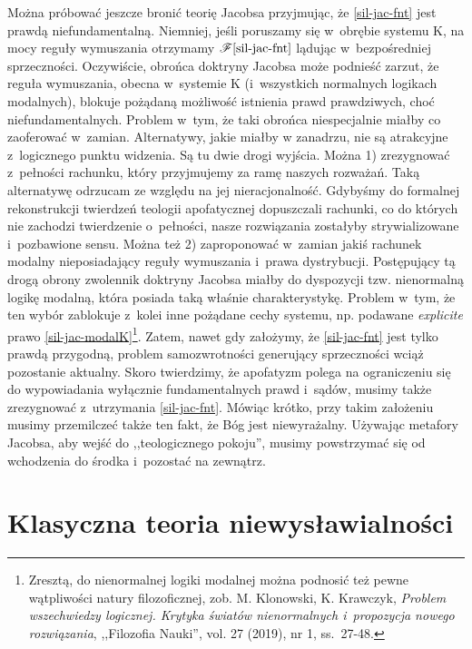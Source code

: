 Można próbować jeszcze bronić teorię Jacobsa przyjmując, że \ref{sil-jac-fnt} jest prawdą niefundamentalną. Niemniej, jeśli poruszamy się w~obrębie systemu K, na mocy reguły wymuszania otrzymamy $\mathscr{F} \eqref{sil-jac-fnt}$ lądując w~bezpośredniej sprzeczności. Oczywiście, obrońca doktryny Jacobsa może podnieść zarzut, że reguła wymuszania, obecna w~systemie K (i~wszystkich normalnych logikach modalnych), blokuje pożądaną możliwość istnienia prawd prawdziwych, choć niefundamentalnych. Problem w~tym, że taki obrońca niespecjalnie miałby co zaoferować w~zamian. Alternatywy, jakie miałby w zanadrzu, nie są atrakcyjne z~logicznego punktu widzenia. Są tu dwie drogi wyjścia. Można 1) zrezygnować z~pełności rachunku, który przyjmujemy za ramę naszych rozważań. Taką alternatywę odrzucam ze względu na jej nieracjonalność. Gdybyśmy do formalnej rekonstrukcji twierdzeń teologii apofatycznej dopuszczali rachunki, co do których nie zachodzi twierdzenie o~pełności, nasze rozwiązania zostałyby strywializowane i~pozbawione sensu. Można też 2) zaproponować w~zamian jakiś rachunek modalny nieposiadający reguły wymuszania i~prawa dystrybucji. Postępujący tą drogą obrony zwolennik doktryny Jacobsa miałby do dyspozycji tzw. nienormalną logikę modalną, która posiada taką właśnie charakterystykę. Problem w~tym, że ten wybór zablokuje z~kolei inne pożądane cechy systemu, np. podawane \textit{explicite} prawo \eqref{sil-jac-modalK}\footnote{Zresztą, do nienormalnej logiki modalnej można podnosić też pewne wątpliwości natury filozoficznej, zob. M. Klonowski, K. Krawczyk, \textit{Problem wszechwiedzy logicznej. Krytyka światów nienormalnych i~propozycja nowego rozwiązania}, ,,Filozofia Nauki'', vol. 27 (2019), nr 1, ss.~27-48.}. Zatem, nawet gdy założymy, że \ref{sil-jac-fnt} jest tylko prawdą przygodną, problem samozwrotności generujący sprzeczności wciąż pozostanie aktualny. Skoro twierdzimy, że apofatyzm polega na ograniczeniu się do wypowiadania wyłącznie fundamentalnych prawd i~sądów, musimy także zrezygnować z~utrzymania \ref{sil-jac-fnt}. Mówiąc krótko, przy takim założeniu musimy przemilczeć także ten fakt, że Bóg jest niewyrażalny. Używając metafory Jacobsa, aby wejść do ,,teologicznego pokoju'', musimy powstrzymać się od wchodzenia do środka i~pozostać na zewnątrz.


\chapter{Klasyczna teoria niewysławialności}\label{sil-boch}

